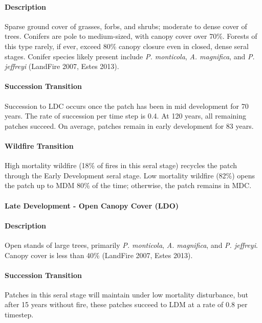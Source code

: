 \paragraph{Description} Sparse ground cover of grasses, forbs, and shrubs; moderate to dense cover of trees. Conifers are pole to medium-sized, with canopy cover over 70\%. Forests of this type rarely, if ever, exceed 80\% canopy closure even in closed, dense seral stages. Conifer species likely present include \emph{P. monticola}, \emph{A. magnifica}, and \emph{P. jeffreyi} (LandFire 2007, Estes 2013).

\paragraph{Succession Transition} Succession to LDC occurs once the patch has been in mid development for 70 years. The rate of succession per time step is 0.4. At 120 years, all remaining patches succeed. On average, patches remain in early development for 83 years.

\paragraph{Wildfire Transition} High mortality wildfire (18\% of fires in this seral stage) recycles the patch through the Early Development seral stage. Low mortality wildfire (82\%) opens the patch up to MDM 80\% of the time; otherwise, the patch remains in MDC.

\noindent\hrulefill


\paragraph{Late Development - Open Canopy Cover (LDO)}

\paragraph{Description} Open stands of large trees, primarily \emph{P. monticola}, \emph{A. magnifica}, and \emph{P. jeffreyi}. Canopy cover is less than 40\% (LandFire 2007, Estes 2013).

\paragraph{Succession Transition} Patches in this seral stage will maintain under low mortality disturbance, but after 15 years without fire, these patches succeed to LDM at a rate of 0.8 per timestep.

